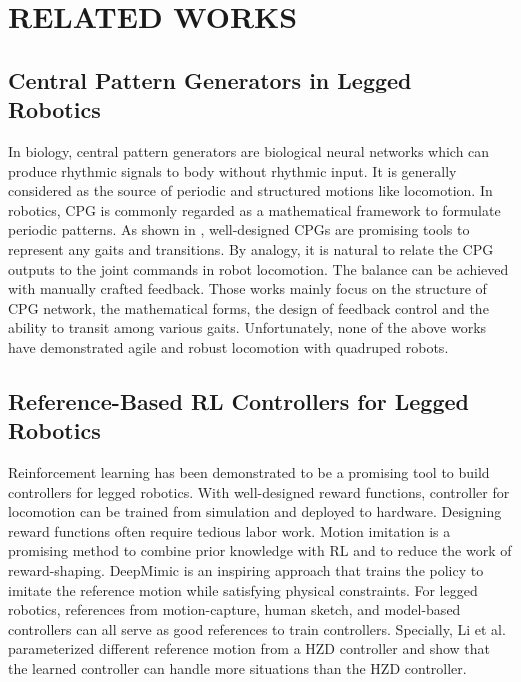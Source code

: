 \documentclass[letterpaper, 10 pt, journal, twoside]{IEEEtran} %
\begin{document}
\section{RELATED WORKS}
\subsection{Central Pattern Generators in Legged Robotics}
In biology, central pattern generators are biological neural networks which can produce rhythmic signals to body without rhythmic input\cite{IJSPEERT2008642}. It is generally considered as the source of periodic and structured motions like locomotion. In robotics, CPG is commonly regarded as a mathematical framework to formulate periodic patterns. As shown in \cite{dutta2019,Righetti2006}, well-designed CPGs are promising tools to represent any gaits and transitions. By analogy, it is natural to relate the CPG outputs to the joint commands in robot locomotion. The balance can be achieved with manually crafted feedback. Those works mainly focus on the structure of CPG network\cite{habu2019}, the mathematical forms\cite{10.3389/fnbot.2016.00006,dutta2019,app8010056}, the design of feedback control\cite{6696353,4543306} and the ability to transit among various gaits\cite{Fukuoka2015,7090642}. Unfortunately, none of the above works have demonstrated agile and robust locomotion with quadruped robots.

\subsection{Reference-Based RL Controllers for Legged Robotics}
Reinforcement learning has been demonstrated to be a promising tool to build controllers for legged robotics\cite{Hwangboeaau5872,Leeeabc5986,gangapurwala2020rloc,tan2018simtoreal}. With well-designed reward functions, controller for locomotion can be trained from simulation and deployed to hardware\cite{Hwangboeaau5872}. Designing reward functions often require tedious labor work. Motion imitation is a promising method to combine prior knowledge with RL and to reduce the work of reward-shaping. DeepMimic\cite{2018-TOG-deepMimic} is an inspiring approach that trains the policy to imitate the reference motion while satisfying physical constraints. For legged robotics, references from motion-capture, human sketch, and model-based controllers can all serve as good references to train controllers\cite{RoboImitationPeng20,siekmann2020learning,Li2021}. Specially, Li et al.\cite{Li2021} parameterized different reference motion from a HZD controller and show that the learned controller can handle more situations than the HZD controller.
\end{document}
